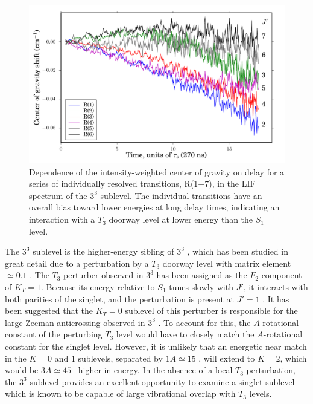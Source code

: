 \begin{figure}
  \caption{Dependence of the intensity-weighted center of gravity on
    delay for a series of individually resolved transitions, R(1$-$7),
    in the LIF spectrum of the $3^3$  sublevel.  The individual
    transitions have an overall bias toward lower energies at long
    delay times, indicating an interaction with a $T_3$ doorway level
    at lower energy than the $S_1$ level.}
  \label{fig:33k2-cog-delay}
  \centering
  \includegraphics[width=6in]{33k2-r123456-cog-delay.pdf}
\end{figure}


The $3^3$  sublevel is the higher-energy sibling of $3^3$
, which has been studied in great detail due to a perturbation
by a $T_3$ doorway level with matrix element $\simeq 0.1$ \rcm.  The
$T_3$ perturber observed in $3^3$  has been assigned as the
$F_2$ component of $K_T=1$.  Because
its energy relative to $S_1$ tunes slowly with $J'$,
it interacts with both parities of the singlet, and
the perturbation is present at $J'=1$
\cite{mishra04}.  It has been suggested that the $K_T=0$ sublevel of
this perturber is responsible for the large Zeeman anticrossing
observed in $3^3$  \cite{thom07, dupre93}.  To account for this,
the $A$-rotational constant of the perturbing $T_3$ level would have
to closely match the $A$-rotational constant for the singlet level.
However, it is unlikely that an energetic near match in the $K=0$ and
$1$ sublevels, separated by $1A \simeq 15$ \rcm, will extend to $K=2$,
which would be $3A \simeq 45$ \rcm\ higher in energy.  In the absence
of a local $T_3$ perturbation, the $3^3$  sublevel provides an
excellent opportunity to examine a singlet sublevel which is known to
be capable of large vibrational overlap with $T_3$ levels.

